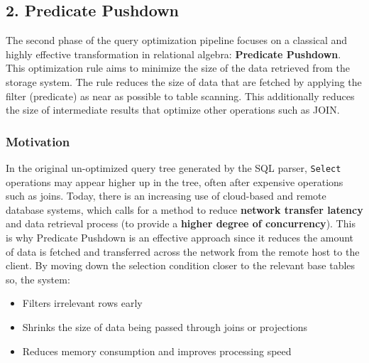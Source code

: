 \documentclass[12pt]{article}
\begin{document}
\subsection*{2. Predicate Pushdown}

The second phase of the query optimization pipeline focuses on a classical and highly effective transformation in relational algebra: \textbf{Predicate Pushdown}. 
This optimization rule aims to minimize the size of the data retrieved from the storage system. The rule reduces the size of data that are fetched by applying the filter (predicate) as near as possible to table scanning. This additionally reduces the size of intermediate results that optimize other operations such as JOIN.

\subsubsection*{Motivation}

In the original un-optimized query tree generated by the SQL parser, \texttt{Select} operations may appear higher up in the tree, often after expensive operations such as joins. Today, there is an increasing use of cloud-based and remote database systems, which calls for a method to reduce \textbf{network transfer latency} and data retrieval process (to provide a \textbf{higher degree of concurrency}). This is why Predicate Pushdown is an effective approach since it reduces the amount of data is fetched and transferred across the network from the remote host to the client. By moving down the selection condition closer to the relevant base tables so, the system:
\begin{itemize}
    \item Filters irrelevant rows early
    \item Shrinks the size of data being passed through joins or projections
    \item Reduces memory consumption and improves processing speed
\end{itemize}
\end{document}
